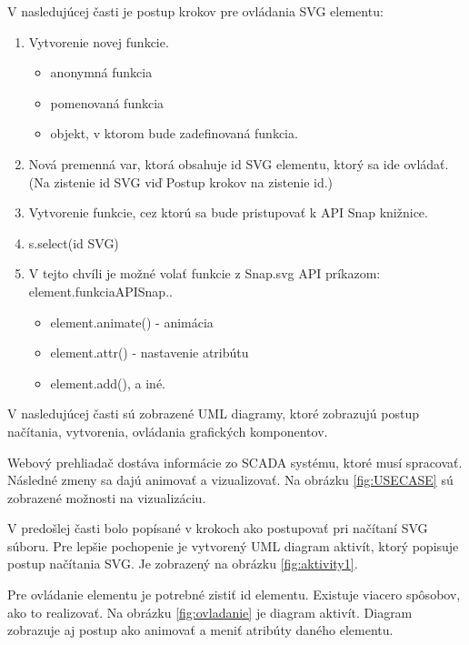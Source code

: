 V nasledujúcej časti je postup krokov pre ovládania SVG elementu:

\begin{enumerate}
	\item Vytvorenie novej funkcie. 
	\begin{itemize}
		\item anonymná funkcia 
		\item pomenovaná funkcia
		\item objekt, v ktorom bude zadefinovaná funkcia. 
	\end{itemize}
	\item Nová premenná var, ktorá obsahuje id SVG elementu, ktorý sa ide ovládať. (Na zistenie id SVG viď Postup krokov na zistenie id.)
	\item Vytvorenie funkcie, cez ktorú sa bude pristupovať k API Snap knižnice. 
	\item s.select(id SVG)
	\item V tejto chvíli je možné volať funkcie z Snap.svg API príkazom: element.funkciaAPISnap.. 
	\begin{itemize}
		\item element.animate() - animácia
		\item element.attr() - nastavenie atribútu
		\item element.add(), a iné.	
	\end{itemize}	
\end{enumerate}


V nasledujúcej časti sú zobrazené UML diagramy, ktoré zobrazujú postup načítania, vytvorenia, ovládania grafických komponentov. 

Webový prehliadač dostáva informácie zo SCADA systému, ktoré musí spracovať. Následné zmeny sa dajú animovať a vizualizovať. Na obrázku \ref{fig:USECASE} sú zobrazené možnosti na vizualizáciu. 
	
    V predošlej časti bolo popísané v krokoch ako postupovať pri načítaní SVG súboru. Pre lepšie pochopenie je vytvorený UML diagram aktivít, ktorý popisuje postup načítania SVG. Je zobrazený na obrázku \ref{fig:aktivity1}. 
    
    Pre ovládanie elementu je potrebné zistiť id elementu. Existuje viacero spôsobov, ako to realizovať. Na obrázku \ref{fig:ovladanie} je diagram aktivít. Diagram zobrazuje aj postup ako animovať a meniť atribúty daného elementu. 
    
